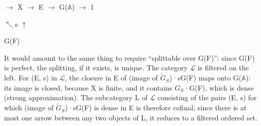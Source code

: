 \documentclass[10pt,a4paper]{article}
\begin{document}
\smallskip
{} \ensuremath{→} X \ensuremath{→} E \ensuremath{→} G(\ensuremath{𝔸}) \ensuremath{→} 1\par
\noindent           \ensuremath{↖}s    \ensuremath{↑}\par
\noindent              G(F)\par
\smallskip
\noindent It would amount to the same thing to require “splittable over G(F)”: since G(F) is perfect, the splitting, if it exists, is unique. The category \ensuremath{ℒ} is filtered on the left. For (E, s) in \ensuremath{ℒ}, the closure in E of (image of \ensuremath{\widetilde{G}_S})·sG(F) maps onto G(\ensuremath{𝔸}): its image is closed, because X is finite, and it contains \ensuremath{G_S}·G(F), which is dense (strong approximation). The subcategory L of \ensuremath{ℒ} consisting of the pairs (E, s) for which (image of \ensuremath{\widetilde{G}_S})·sG(F) is dense in E is therefore cofinal; since there is at most one arrow between any two objects of L, it reduces to a filtered ordered set.\par
\clearpage
{}\hypertarget{authority-page-0003}{}
\end{document}

